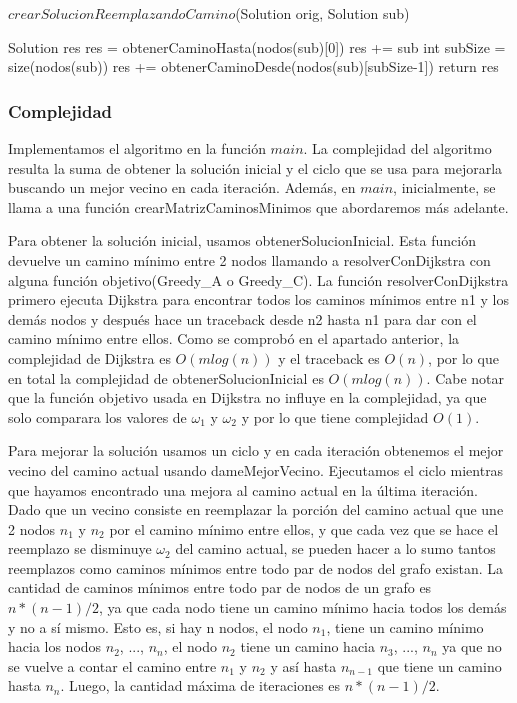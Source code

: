 \begin{algorithm}[H]
\caption{$crearSolucionReemplazandoCamino$(Solution orig, Solution sub)}
\begin{algorithmic}[1]	
	 \State Solution res
	 \State res = obtenerCaminoHasta(nodos(sub)[0])
	 \State res += sub
	 \State int subSize = size(nodos(sub))
	 \State res += obtenerCaminoDesde(nodos(sub)[subSize-1])	  
	\State return res
\end{algorithmic}
\end{algorithm}

\subsubsection{Complejidad}

Implementamos el algoritmo en la función $main$. La complejidad del algoritmo resulta la suma de obtener la solución inicial y el ciclo que se usa para mejorarla buscando un mejor vecino en cada iteración. 
Además, en $main$, inicialmente, se llama a una función crearMatrizCaminosMinimos que abordaremos más adelante.

Para obtener la solución inicial, usamos obtenerSolucionInicial. Esta función devuelve un camino mínimo entre 2 nodos llamando a resolverConDijkstra con alguna función objetivo(Greedy\_A o Greedy\_C). La función resolverConDijkstra primero ejecuta Dijkstra para encontrar todos los caminos mínimos entre n1 y los demás nodos y después hace un traceback desde n2 hasta n1 para dar con el camino mínimo entre ellos. Como se comprobó en el apartado anterior, la complejidad de Dijkstra es $O(m log(n))$ y el traceback es $O(n)$, por lo que en total la complejidad de obtenerSolucionInicial es $O(m log(n))$. Cabe notar que la función objetivo usada en Dijkstra no influye en la complejidad, ya que solo comparara los valores de $\omega_1$ y $\omega_2$ y por lo que tiene complejidad $O(1)$.

Para mejorar la solución usamos un ciclo y en cada iteración obtenemos el mejor vecino del camino actual usando dameMejorVecino. Ejecutamos el ciclo mientras que hayamos encontrado una mejora al camino actual en la última iteración. 
Dado que un vecino consiste en reemplazar la porción del camino actual que une 2 nodos $n_1$ y $n_2$ por el camino mínimo entre ellos, y que cada vez que se hace el reemplazo se disminuye $\omega_2$ del camino actual, se pueden hacer a lo sumo tantos reemplazos como caminos mínimos entre todo par de nodos del grafo existan. 
La cantidad de caminos mínimos entre todo par de nodos de un grafo es $n * (n-1) / 2$, ya que cada nodo tiene un camino mínimo hacia todos los demás y no a sí mismo. Esto es, si hay n nodos, el nodo $n_1$, tiene un camino mínimo hacia los nodos $n_2$, ..., $n_n$, el nodo $n_2$ tiene un camino hacia $n_3$, ..., $n_n$ ya que no se vuelve a contar el camino entre $n_1$ y $n_2$ y así hasta $n_{n-1}$ que tiene un camino hasta $n_n$.
Luego, la cantidad máxima de iteraciones es $n * (n-1) / 2$.

